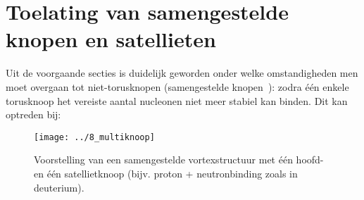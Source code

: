 \section{Toelating van samengestelde knopen en satellieten}

Uit de voorgaande secties is duidelijk geworden onder welke omstandigheden men moet overgaan tot niet-torusknopen (samengestelde knopen~\cite{Faddeev1997KnottedSolitions}): zodra
één enkele torusknoop het vereiste aantal nucleonen niet meer stabiel kan binden. Dit kan optreden bij:

\begin{figure}[H]
    \centering
    \texttt{[image: ../8\_multiknoop]}
    \caption{Voorstelling van een samengestelde vortexstructuur met één hoofd- en één satellietknoop (bijv. proton + neutronbinding zoals in deuterium).}
    \label{fig:satellietknoop}
\end{figure}

